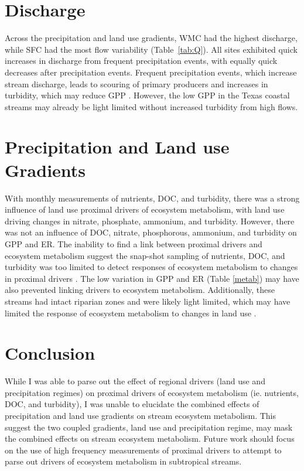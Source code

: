 \section{Discharge}

Across the precipitation and land use gradients, WMC had the highest discharge, while SFC had the most flow variability (Table~\ref{tab:Q}). All sites exhibited quick increases in discharge from frequent precipitation events, with equally quick decreases after precipitation events. Frequent precipitation events, which increase stream discharge, leads to scouring of primary producers and increases in turbidity, which may reduce GPP \cite{uehlinger_resistance_2000, hall_turbidity_2015}. However, the low GPP in the Texas coastal streams may already be light limited without increased turbidity from high flows. 


\section{Precipitation and Land use Gradients}

With monthly measurements of nutrients, DOC, and turbidity, there was a strong influence of land use proximal drivers of ecosystem metabolism, with land use driving changes in nitrate, phosphate, ammonium, and turbidity. However, there was not an influence of DOC, nitrate, phosphorous, ammonium, and turbidity on GPP and ER.  The inability to find a link between proximal drivers and ecosystem metabolism suggest the snap-shot sampling of nutrients, DOC, and turbidity was too limited to detect responses of ecosystem metabolism to changes in proximal drivers \cite{bernot_inter-regional_2010}. The low variation in GPP and ER (Table \ref{metab}) may have also prevented linking drivers to ecosystem metabolism. Additionally, these streams had intact riparian zones and were likely light limited, which may have limited the response of ecosystem metabolism to changes in land use \cite{jankowskiLandUseChange2021, bernhardtLightFlowRegimes2022, griffithsAgriculturalLandUse2013}.

\section{Conclusion}


While I was able to parse out the effect of regional drivers (land use and precipitation regimes) on proximal drivers of ecosystem metabolism (ie. nutrients, DOC, and turbidity), I was unable to elucidate the combined effects of precipitation and land use gradients on stream ecosystem metabolism. This suggest the two coupled gradients, land use and precipitation regime, may mask the combined effects on stream ecosystem metabolism. Future work should focus on the use of high frequency measurements of proximal drivers to attempt to parse out drivers of ecosystem metabolism in subtropical streams. 




